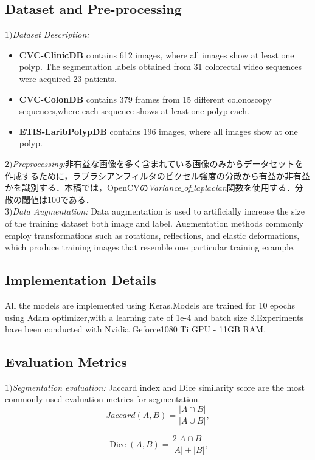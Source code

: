 \documentclass{article}
\begin{document}
\subsection{Dataset and Pre-processing}
\(1)\){\it Dataset Description:}
\begin{itemize}
\item {\bf CVC-ClinicDB} contains 612 images, where all images show at least one polyp. The segmentation labels obtained from 31 colorectal video sequences were acquired 23 patients.
\item {\bf CVC-ColonDB} contains 379 frames from 15 different colonoscopy sequences,where each sequence shows at least one polyp each.
\item {\bf ETIS-LaribPolypDB} contains 196 images, where all images show at one polyp. 
\end{itemize}
\(2)\){\it Preprocessing:}非有益な画像を多く含まれている画像のみからデータセットを作成するために，ラプラシアンフィルタのピクセル強度の分散から有益か非有益かを識別する．本稿では，OpenCVの{\it Variance$\_$of$\_$laplacian}関数を使用する．分散の閾値は$100$である．\\
\(3)\){\it Data Augmentation:} Data augmentation is used to artificially increase the size of the training dataset both image and label. Augmentation methods commonly employ transformations such as rotations, reflections, and elastic deformations, which produce training images that resemble one particular training example.

\subsection{Implementation Details}
All the models are implemented using Keras.Models are trained for 10 epochs using Adam optimizer,with a learning rate of 1e-4 and batch size 8.Experiments have been conducted with Nvidia Geforce1080 Ti GPU - 11GB RAM.
\subsection{Evaluation Metrics}
\(1)\){\it Segmentation  evaluation: }Jaccard index and Dice similarity score are the most commonly used evaluation metrics for segmentation.
\begin{equation}
J a c c a r d(A, B)=\frac{|A \cap B|}{|A \cup B|},
\end{equation}

\begin{equation}
\operatorname{Dice}(A, B)=\frac{2|A \cap B|}{|A|+|B|},
\end{equation}
\end{document}
